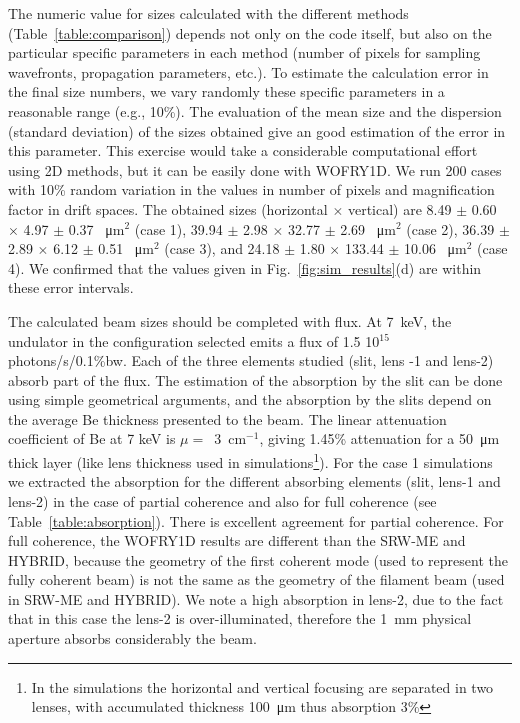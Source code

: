 \documentclass{iucr}              %
\begin{document}
The numeric value for sizes calculated with the different methods (Table~\ref{table:comparison}) depends not only on the code itself, but also on the particular specific parameters in each method (number of pixels for sampling wavefronts, propagation parameters, etc.). To estimate the calculation error in the final size numbers, we vary randomly these specific parameters in a reasonable range (e.g., 10\%). The evaluation of the mean size and the dispersion (standard deviation) of the sizes obtained give an good estimation of the error in this parameter. This exercise would take a considerable computational effort using 2D methods, but it can be easily done with WOFRY1D. We run 200 cases with 10\% random variation in the values in number of pixels and magnification factor in drift spaces. The obtained sizes (horizontal $\times$ vertical) are  
8.49 $\pm$ 0.60 $\times$ 4.97 $\pm$ 0.37 \SI{}{\micro\meter}$^2$ (case 1),
39.94 $\pm$ 2.98 $\times$ 32.77 $\pm$ 2.69 \SI{}{\micro\meter}$^2$ (case 2),
36.39 $\pm$ 2.89 $\times$ 6.12 $\pm$ 0.51 \SI{}{\micro\meter}$^2$ (case 3), and
24.18 $\pm$ 1.80 $\times$ 133.44 $\pm$ 10.06 \SI{}{\micro\meter}$^2$ (case 4). We confirmed that the values given in Fig.~\ref{fig:sim_results}(d) are within these error intervals.

The calculated beam sizes should be completed with flux. At \SI{7}{keV}, the undulator in the configuration selected emits a flux of 1.5 10$^{15}$ photons/s/0.1\%bw. Each of the three elements studied (slit, lens -1 and lens-2) absorb part of the flux. The estimation of the absorption by the slit can be done using simple geometrical arguments, and the absorption by the slits depend on the average Be thickness presented to the beam. The linear attenuation coefficient of Be at 7 keV is $\mu=$~\SI{3}{\centi\meter}$^{-1}$, giving 1.45\% attenuation for a \SI{50}{\micro\meter} thick layer (like lens thickness used in simulations\footnote{In the simulations the horizontal and vertical focusing are separated in two lenses, with accumulated thickness \SI{100}{\micro\meter} thus absorption 3\%}). For the case 1 simulations we extracted the absorption for the different absorbing elements (slit, lens-1 and lens-2) in the case of partial coherence and also for full coherence (see Table~\ref{table:absorption}).
There is excellent agreement for partial coherence. For full coherence, the WOFRY1D results are different than the SRW-ME and HYBRID, because the geometry of the first coherent mode (used to represent the fully coherent beam) is not the same as the geometry of the filament beam (used in SRW-ME and HYBRID). We note a high absorption in lens-2, due to the fact that in this case the lens-2 is over-illuminated, therefore the \SI{1}{\milli\meter} physical aperture absorbs considerably the beam.
\end{document}
